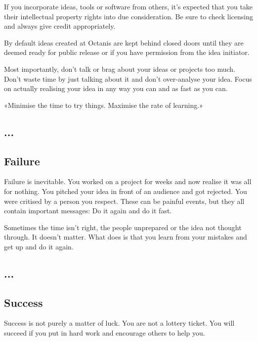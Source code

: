 	If you incorporate ideas, tools or software from others, it's expected that you take their intellectual property rights into due consideration. Be sure to check licensing and always give credit appropriately.

	By default ideas created at Octanis are kept behind closed doors until they are deemed ready for public release or if you have permission from the idea initiator.

	Most importantly, don't talk or brag about your ideas or projects too much. Don't waste time by just talking about it and don't over-analyse your idea. Focus on actually realising your idea in any way you can and as fast as you can. 

	«Minimise the time to try things. Maximise the rate of learning.»





\french
	\subsection{...}


\english
	\subsection{Failure}
	Failure is inevitable. You worked on a project for weeks and now realise it was all for nothing. You pitched your idea in front of an audience and got rejected. You were critised by a person you respect. 
	These can be painful events, but they all contain important messages: Do it again and do it fast.

	Sometimes the time isn't right, the people unprepared or the idea not thought through. It doesn't matter. What does is that you learn from your mistakes and get up and do it again. 



\french
	\subsection{...}


\english
	\subsection{Success}
	
	Success is not purely a matter of luck. You are not a lottery ticket. You will succeed if you put in hard work and encourage others to help you. 



